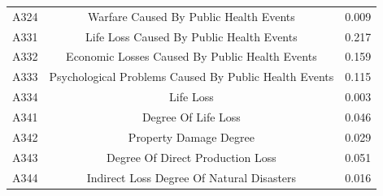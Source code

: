 \documentclass[12pt]{article}  %
\begin{document}
\begin{subappendices}
\begin{table}[!ht]
\begin{tabular}{ccc}
        A324 & Warfare Caused By Public Health Events &0.009 \\ 
        A331 & Life Loss Caused By Public Health Events &0.217\\ 
        A332 & Economic Losses Caused By Public Health Events &0.159 \\ 
        A333 & Psychological Problems Caused By Public Health Events &0.115 \\ 
        A334 & Life Loss &0.003 \\ 
        A341 & Degree Of Life Loss &0.046\\ 
        A342 & Property Damage Degree&0.029  \\ 
        A343 & Degree Of Direct Production Loss&0.051  \\ 
        A344 & Indirect Loss Degree Of Natural Disasters&0.016  \\ \hline
    \end{tabular}
\end{table}

\end{subappendices}  %
\end{document}
